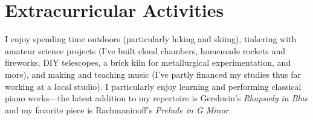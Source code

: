 \documentclass[11pt]{article}
\begin{document}
\section{Extracurricular Activities}
I enjoy spending time outdoors (particularly hiking and skiing), tinkering with amateur science projects (I've built cloud chambers, homemade rockets and fireworks, DIY telescopes, a brick kiln for metallurgical experimentation, and more), and making and teaching music (I've partly financed my studies thus far working at a local studio). I particularly enjoy learning and performing classical piano works---the latest addition to my repertoire is Gershwin's \textit{Rhapsody in Blue} and my favorite piece is Rachmaninoff's \textit{Prelude in G Minor}.
\end{document}
